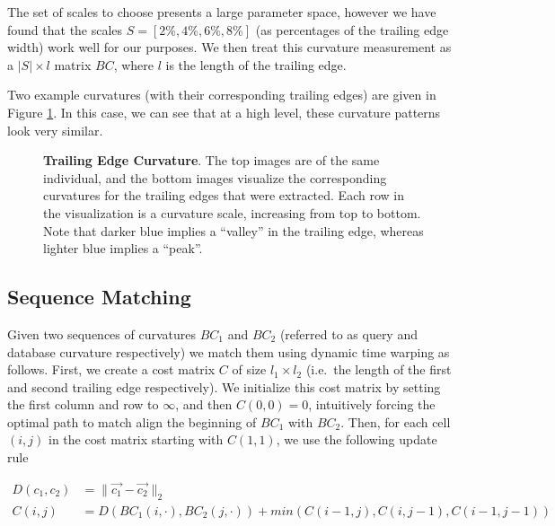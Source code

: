 The set of scales to choose presents a large parameter space, however we have found that the scales $S = [2\%, 4\%, 6\%, 8\%]$ (as percentages of the trailing edge width) work well for our purposes.
We then treat this curvature measurement as a $|S| \times l$ matrix $BC$, where $l$ is the length of the trailing edge.

Two example curvatures (with their corresponding trailing edges) are given in Figure \ref{fig:example_curv}.
In this case, we can see that at a high level, these curvature patterns look very similar.

\begin{figure}[t]%
\centering
{}
\newline
{}
\caption{\textbf{Trailing Edge Curvature}. The top images are of the same individual, and the bottom images visualize the corresponding curvatures for the trailing edges that were extracted. Each row in the visualization is a curvature scale, increasing from top to bottom. Note that darker blue implies a ``valley'' in the trailing edge, whereas lighter blue implies a ``peak''.}
\label{fig:example_curv}
\end{figure}

\subsection{Sequence Matching}

Given two sequences of curvatures $BC_1$ and $BC_2$ (referred to as query and database curvature respectively) we match them using dynamic time warping as follows.
First, we create a cost matrix $C$ of size $l_1 \times l_2$ (i.e.\ the length of the first and second trailing edge respectively). 
We initialize this cost matrix by setting the first column and row to $\infty$, and then $C(0,0) = 0$, intuitively forcing the optimal path to match align the beginning of $BC_1$ with $BC_2$.
Then, for each cell $(i,j)$ in the cost matrix starting with $C(1,1)$, we use the following update rule

\begin{align} 
\label{eqn:dtw_dist}
D(c_1, c_2) &= \lVert \vec{c_1} - \vec{c_2} \rVert_2\\
\label{eqn:dtw_update}
C(i,j) &= D(BC_1(i,\cdot),BC_2(j,\cdot)) + min(C(i-1,j), C(i,j-1), C(i-1, j-1))
\end{align}

